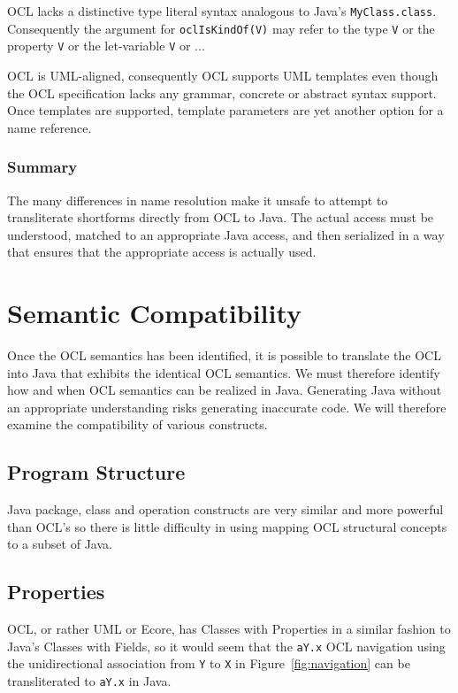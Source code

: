 \documentclass[sigconf]{acmart}
\begin{document}
OCL lacks a distinctive type literal syntax analogous to Java's \texttt{MyClass.class}. Consequently the argument for \texttt{oclIsKindOf(V)} may refer to the type \texttt{V} or the property \texttt{V} or the let-variable \texttt{V} or ...

OCL is UML-aligned, consequently OCL supports UML templates even though the OCL specification lacks any grammar, concrete or abstract syntax support. Once templates are  supported, template parameters are yet another option for a name reference.

\subsubsection{Summary}

The many differences in name resolution make it unsafe to attempt to transliterate shortforms directly from OCL to Java. The actual access must be understood, matched to an appropriate Java access, and then serialized in a way that ensures that the appropriate access is actually used.

\section{Semantic Compatibility}\label{Semantic Compatibility}

Once the OCL semantics has been identified, it is possible to translate the OCL into Java that exhibits the identical OCL semantics. We must therefore identify how and when OCL semantics can be realized in Java. Generating Java without an appropriate understanding risks generating inaccurate code. We will therefore examine the compatibility of various constructs.

\subsection{Program Structure}
	
Java package, class and operation constructs are very similar and more powerful than OCL's so there is little difficulty in using mapping OCL structural concepts to a subset of Java.

\subsection{Properties}\label{Properties}

OCL, or rather UML or Ecore, has Classes with Properties in a similar fashion to Java's Classes with Fields, so it would seem that the \verb|aY.x| OCL navigation using the unidirectional association from \verb|Y| to \verb|X| in Figure~\ref{fig:navigation} can be transliterated to \verb|aY.x| in Java.
\end{document}
